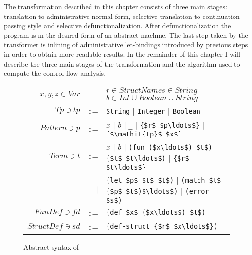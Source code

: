 The transformation described in this chapter consists of three main stages: translation to administrative normal form, selective translation to continuation-passing style and selective defunctionalization.
After defunctionalization the program is in the desired form of an abstract machine.
The last step taken by the transformer is inlining of administrative let-bindings introduced by previous steps in order to obtain more readable results.
In the remainder of this chapter I will describe the three main stages of the transformation and the algorithm used to compute the control-flow analysis.


\begin{figure}[t]
\begin{center}
\begingroup
\setlength{\tabcolsep}{2pt}
\begin{tabular}{rrl}
  $x, y, z \in Var$ && $r\in StructName$\quad$s \in String$ \quad $b \in Int \cup Boolean \cup String$\\
  $Tp \ni \mathit{tp} $ &::=& \lstinline!String! | \lstinline!Integer! | \lstinline!Boolean!\\
  $Pattern \ni p $ &::=& $x$ | $b$ | \lstinline!_! | \lstinline!{$r$ $p\ldots$}! |  \lstinline![$\mathit{tp}$ $x$]!\\
  $Term \ni t$ &::=& $x$ | $b$
              | \lstinline!(fun ($x\ldots$) $t$)!
              | \lstinline!($t$ $t\ldots$)!
              | \lstinline!{$r$ $t\ldots$}!\\
              &|& \lstinline!(let $p$ $t$ $t$)!
              | \lstinline!(match $t$ ($p$ $t$)$\ldots$)!
              | \lstinline!(error $s$)!\\
  $FunDef \ni \mathit{fd}$ &::=& \lstinline!(def $x$ ($x\ldots$) $t$)!\\
  $StructDef \ni \mathit{sd}$ &::=& \lstinline!(def-struct {$r$ $x\ldots$})!\\
\end{tabular}
\endgroup
\end{center}
\caption{Abstract syntax of \IDL{}}\label{fig:idl-abs-syntax}
\end{figure}


